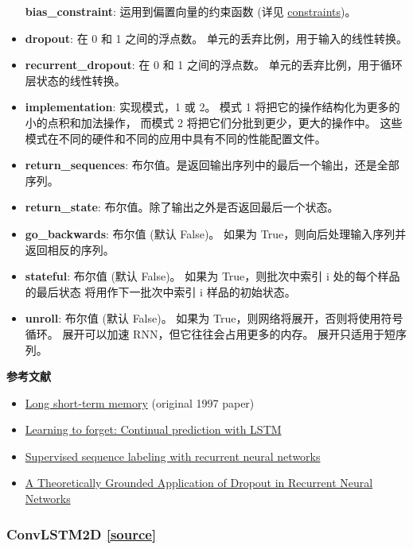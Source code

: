 \begin{itemize}
  \textbf{bias\_constraint}: 运用到偏置向量的约束函数 (详见
  \hyperref[constraints]{constraints})。
\item
  \textbf{dropout}: 在 0 和 1 之间的浮点数。
  单元的丢弃比例，用于输入的线性转换。
\item
  \textbf{recurrent\_dropout}: 在 0 和 1 之间的浮点数。
  单元的丢弃比例，用于循环层状态的线性转换。
\item
  \textbf{implementation}: 实现模式，1 或 2。 模式 1
  将把它的操作结构化为更多的小的点积和加法操作， 而模式 2
  将把它们分批到更少，更大的操作中。
  这些模式在不同的硬件和不同的应用中具有不同的性能配置文件。
\item
  \textbf{return\_sequences}:
  布尔值。是返回输出序列中的最后一个输出，还是全部序列。
\item
  \textbf{return\_state}: 布尔值。除了输出之外是否返回最后一个状态。
\item
  \textbf{go\_backwards}: 布尔值 (默认 False)。 如果为
  True，则向后处理输入序列并返回相反的序列。
\item
  \textbf{stateful}: 布尔值 (默认 False)。 如果为 True，则批次中索引 i
  处的每个样品的最后状态 将用作下一批次中索引 i 样品的初始状态。
\item
  \textbf{unroll}: 布尔值 (默认 False)。 如果为
  True，则网络将展开，否则将使用符号循环。 展开可以加速
  RNN，但它往往会占用更多的内存。 展开只适用于短序列。
\end{itemize}

\textbf{参考文献}

\begin{itemize}
\tightlist
\item
  \href{http://www.bioinf.jku.at/publications/older/2604.pdf}{Long
  short-term memory} (original 1997 paper)
\item
  \href{http://www.mitpressjournals.org/doi/pdf/10.1162/089976600300015015}{Learning
  to forget: Continual prediction with LSTM}
\item
  \href{http://www.cs.toronto.edu/~graves/preprint.pdf}{Supervised
  sequence labeling with recurrent neural networks}
\item
  \href{http://arxiv.org/abs/1512.05287}{A Theoretically Grounded
  Application of Dropout in Recurrent Neural Networks}
\end{itemize}




\subsubsection{ConvLSTM2D {\href{https://github.com/keras-team/keras/blob/master/keras/layers/convolutional_recurrent.py\#L169}{{[}source{]}}}}

